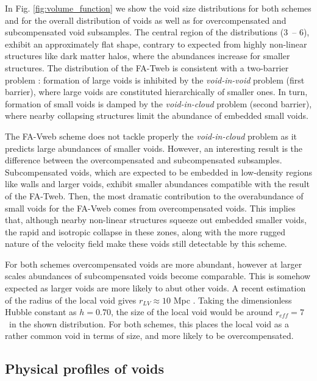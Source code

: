 \documentclass[a4,useAMS,usenatbib,usegraphicx]{latex/mn2e}
\begin{document}
In Fig. \ref{fig:volume_function} we show the void size distributions
for both schemes and for the overall distribution of voids as well as for 
overcompensated and subcompensated void subsamples. The central region of
the distributions ($3$\hMpc\ -- $6$\hMpc), exhibit an approximately flat 
shape, contrary to expected from highly non-linear structures like dark 
matter halos, where the abundances increase for smaller structures. 
The distribution of the FA-Tweb is consistent with a two-barrier problem 
\citep{Sheth04}: formation of large voids is inhibited by the 
\textit{void-in-void} problem (first barrier), where large voids are 
constituted hierarchically of smaller ones. In turn, formation of small 
voids is damped by the \textit{void-in-cloud} problem (second barrier), 
where nearby collapsing structures limit the abundance of embedded small 
voids.


The FA-Vweb scheme does not tackle properly the \textit{void-in-cloud} 
problem as it predicts large abundances of smaller voids. However, an 
interesting result is the difference between the overcompensated and 
subcompensated subsamples. Subcompensated voids, which are expected to 
be embedded in low-density regions like walls and larger voids, exhibit
smaller abundances compatible with the result of the FA-Tweb. Then, the 
most dramatic contribution to the overabundance of small voids for the 
FA-Vweb comes from overcompensated voids. This implies that, although
nearby non-linear structures squeeze out embedded smaller voids, the
rapid and isotropic collapse in these zones, along with the more rugged 
nature of the velocity field make these voids still detectable by this 
scheme.


For both schemes overcompensated voids are more abundant, however at 
larger scales abundances of subcompensated voids become comparable. This 
is somehow expected as larger voids are more likely to abut other voids.
A recent estimation of the radius of the local void gives $r_{LV}\approx
10$ Mpc \citep{Nasonova11}. Taking the dimensionless Hubble constant as 
$h = 0.70$, the size of the local void would be around $r_{eff} = 7$
\hMpc\ in the shown distribution. For both schemes, this places the local
void as a rather common void in terms of size, and more likely to be
overcompensated.


\subsection{Physical profiles of voids}
\label{subsec:properties_voids}
\end{document}
